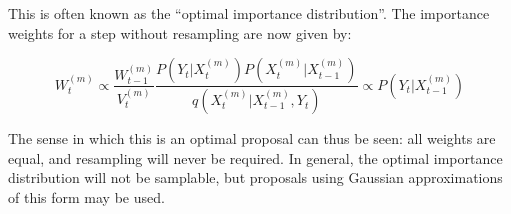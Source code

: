 This is often known as the ``optimal importance distribution''. The importance weights for a step without resampling are now given by:

\begin{equation}
W_t^{(m)} \propto \frac{ W_{t-1}^{(m)} }{ V_t^{(m)} } \frac{ P(Y_t|X_t^{(m)})P(X_t^{(m)}|X_{t-1}^{(m)}) }{q(X_t^{(m)}|X_{t-1}^{(m)}, Y_t)} \propto P(Y_t|X_{t-1}^{(m)})
\label{eq:OptimalImportanceWeights}
\end{equation}

The sense in which this is an optimal proposal can thus be seen: all weights are equal, and resampling will never be required. In general, the optimal importance distribution will not be samplable, but proposals using Gaussian approximations of this form may be used.